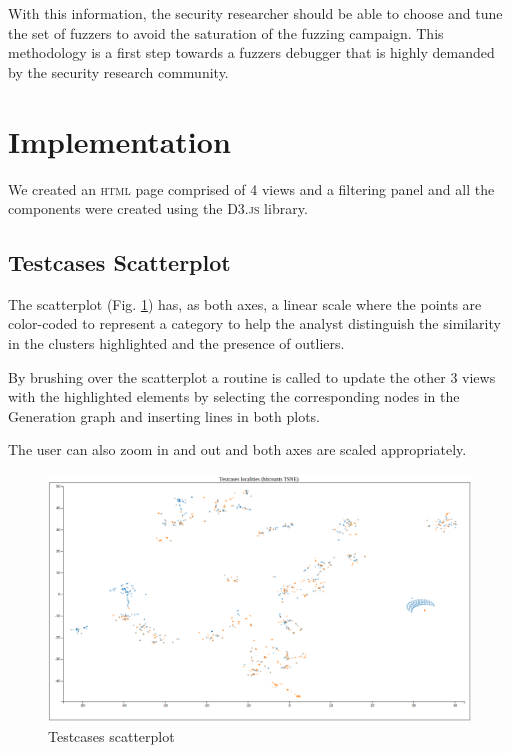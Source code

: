 \documentclass[conference,compsoc]{IEEEtran}
\begin{document}
With this information, the security researcher should be able to choose and tune the set of fuzzers to avoid the saturation of the fuzzing campaign. This methodology is a first step towards a fuzzers debugger that is highly demanded by the security research community.


\section{Implementation}

We created an \textsc{html} page comprised of 4 views and a filtering panel and all the components were created using the \textsc{D3.js} library.

\subsection{Testcases Scatterplot}
 
The scatterplot (Fig. \ref{fig:scatterplot}) has, as both axes, a linear scale where the points are color-coded to represent a category to help the analyst distinguish the similarity in the clusters highlighted and the presence of outliers.\par
By brushing over the scatterplot a routine is called to update the other 3 views with the highlighted elements by selecting the corresponding nodes in the Generation graph and inserting lines in both plots.\par
The user can also zoom in and out and both axes are scaled appropriately.

\begin{figure}[h]
  \includegraphics[scale=0.25]{img/scatterplot}
  \centering
  \caption{Testcases scatterplot}
  \label{fig:scatterplot}
\end{figure}
\end{document}
